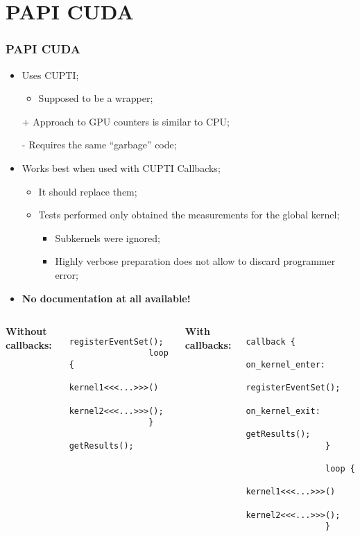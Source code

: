 \section{PAPI CUDA}

\begin{frame}
	\frametitle{PAPI CUDA}
	\begin{itemize}
		\item Uses CUPTI;
		\begin{itemize}
			\item Supposed to be a wrapper;
		\end{itemize}
		\vfill
		\item [+] Approach to GPU counters is similar to CPU;
		\vfill
		\item [-] Requires the same ``garbage'' code;
		\vfill
		\item Works best when used with CUPTI Callbacks;
		\begin{itemize}
			\item It should replace them;
			\item Tests performed only obtained the measurements for the global kernel;
			\begin{itemize}
				\item Subkernels were ignored;
				\item Highly verbose preparation does not allow to discard programmer error;
			\end{itemize}
		\end{itemize}
		\vfill
		\item \textbf{\larger No documentation at all available!}
	\end{itemize}
\end{frame}

\begin{frame}[fragile]
	\begin{columns}
			\textbf{Without callbacks:}
			\begin{verbatim}
				registerEventSet();
				loop {
				   kernel1<<<...>>>()
				   kernel2<<<...>>>();
				}
				getResults();
			\end{verbatim}

			\textbf{With callbacks:}
			\begin{verbatim}
				callback {
				   on_kernel_enter:
				      registerEventSet();
				   on_kernel_exit:
				      getResults();
				}

				loop {
				   kernel1<<<...>>>()
				   kernel2<<<...>>>();
				}
			\end{verbatim}

	\end{columns}

\end{frame}